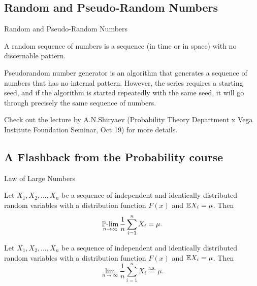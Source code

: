 \subsection{Random and Pseudo-Random Numbers}
    \begin{frame}{Random and Pseudo-Random Numbers}
        \begin{definition}
            A random sequence of numbers is a sequence (in time or in space) with no discernable pattern.
        \end{definition}
        \begin{definition}
            Pseudorandom number generator is an algorithm that generates a sequence of numbers that has no internal pattern. However, the series requires a starting seed, and if the algorithm is started repeatedly with the same seed, it will go through precisely the same sequence of numbers.
        \end{definition}

        Check out the lecture by A.N.Shiryaev (Probability Theory Department x Vega Institute Foundation Seminar, Oct 19) for more details.
    \end{frame}

\subsection{A Flashback from the Probability course}
    \begin{frame}{Law of Large Numbers}
        \begin{theorem}[Khinchin]
            Let $X_1, X_2, \dots, X_n$ be a sequence of independent and identically distributed random variables with a distribution function $F(x)$ and $\mathbb{E} X_i = \mu$. Then
            \begin{equation}
                \operatorname*{\operatorname{\mathbb{P}-lim}}_{n \to \infty} \frac{1}{n} \sum_{i=1}^n X_i = \mu.
            \end{equation}
        \end{theorem}
        \begin{theorem}[Kolmogorov]
            Let $X_1, X_2, \dots, X_n$ be a sequence of independent and identically distributed random variables with a distribution function $F(x)$ and $\mathbb{E} X_i = \mu$. Then
            \begin{equation}
                \lim_{n \to \infty} \frac{1}{n} \sum_{i=1}^n X_i \overset{\text{a.s.}}{=} \mu.
            \end{equation}
        \end{theorem}
    \end{frame}

